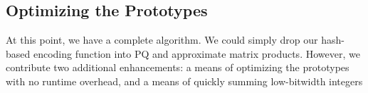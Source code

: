 

\vspace{-1.5mm}
\subsection{Optimizing the Prototypes}
\vspace{-.5mm}

At this point, we have a complete algorithm. We could simply drop our hash-based encoding function into PQ and approximate matrix products. However, we contribute two additional enhancements: a means of optimizing the prototypes with no runtime overhead, and a means of quickly summing low-bitwidth integers

